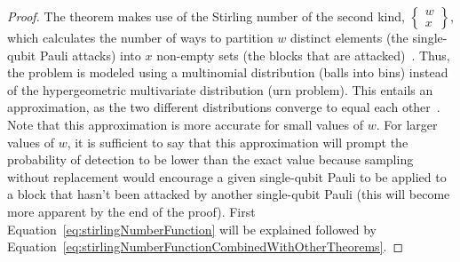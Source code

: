 \begin{proof}
The theorem makes use of the Stirling number of the second kind, $\left\{\begin{smallmatrix}w\\x\end{smallmatrix}\right\}$, which calculates the number of ways to partition $w$ distinct elements (the single-qubit Pauli attacks) into $x$ non-empty sets (the blocks that are attacked)~\cite{StirlingNumberOfTheSecondKind}. Thus, the problem is modeled using a multinomial distribution (balls into bins) instead of the hypergeometric multivariate distribution (urn problem). This entails an approximation, as the two different distributions converge to equal each other~\cite{TheMultivariateHypergeometricDistribution}. Note that this approximation is more accurate for small values of $w$. For larger values of $w$, it is sufficient to say that this approximation will prompt the probability of detection to be lower than the exact value because sampling without replacement would encourage a given single-qubit Pauli to be applied to a block that hasn't been attacked by another single-qubit Pauli (this will become more apparent by the end of the proof). First Equation~\eqref{eq:stirlingNumberFunction} will be explained followed by Equation~\eqref{eq:stirlingNumberFunctionCombinedWithOtherTheorems}. 


\end{proof}
